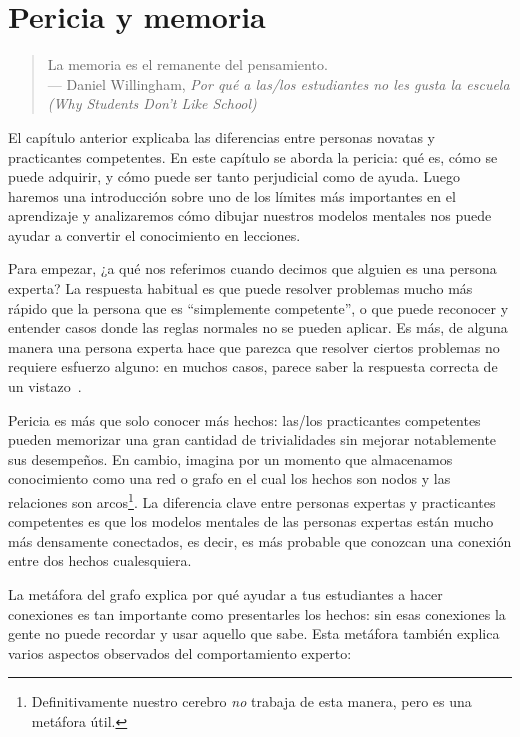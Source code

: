 \chapter{Pericia y memoria}\label{s:memory}

\begin{quote}

  La memoria es el remanente del pensamiento. \\
  --- Daniel Willingham, \emph{Por qué a las/los estudiantes no les gusta la escuela (Why Students Don't Like School)}

\end{quote}

El capítulo anterior explicaba las diferencias entre personas novatas y practicantes competentes.
En este capítulo se aborda la pericia:
qué es,
cómo se puede adquirir,
y cómo puede ser tanto perjudicial como de ayuda.
Luego haremos una introducción sobre uno de los límites más importantes en el aprendizaje
y analizaremos cómo dibujar nuestros modelos mentales nos puede ayudar a convertir el conocimiento en lecciones.

Para empezar,
¿a qué nos referimos cuando decimos que alguien es una persona experta?
La respuesta habitual es que puede resolver problemas mucho más rápido que la persona que es ``simplemente competente'',
o que puede reconocer y entender casos donde las reglas normales no se pueden aplicar.
Es más, de alguna manera una persona experta hace que parezca que resolver ciertos problemas no requiere esfuerzo alguno:
en muchos casos,
parece saber la respuesta correcta de un vistazo~\cite{Parn2017}.

Pericia es más que solo conocer más hechos:
las/los practicantes competentes pueden memorizar una gran cantidad de trivialidades sin  mejorar notablemente sus desempeños.
En cambio,
imagina por un momento que almacenamos conocimiento como una red o grafo en el cual los hechos son nodos
y las relaciones son arcos\footnote{Definitivamente nuestro cerebro \emph{no} trabaja de esta manera, pero es una metáfora útil.}.
La diferencia clave entre personas expertas y practicantes competentes es que
los modelos mentales de las personas expertas están mucho más densamente conectados, 
es decir, es más probable que conozcan una conexión entre dos hechos cualesquiera.

La metáfora del grafo explica por qué ayudar a tus estudiantes a hacer conexiones es tan importante como presentarles los hechos:
sin esas conexiones
la gente no puede recordar y usar aquello que sabe.
Esta metáfora también explica varios aspectos observados del comportamiento experto:

